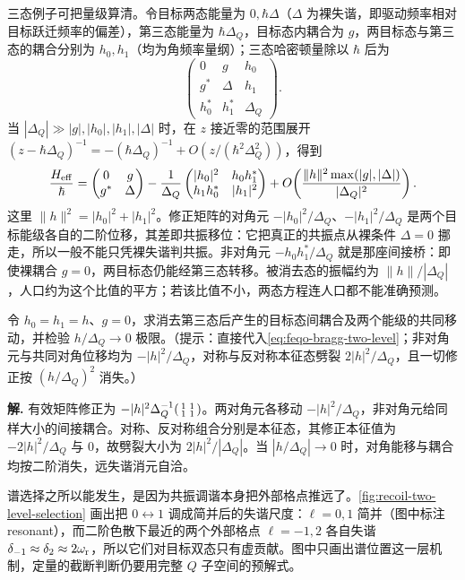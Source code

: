 三态例子可把量级算清。令目标两态能量为 \(0,\hbar\Delta\)（\(\Delta\) 为裸失谐，即驱动频率相对目标跃迁频率的偏差），第三态能量为 \(\hbar\Delta_Q\)，目标态内耦合为 \(g\)，两目标态与第三态的耦合分别为 \(h_0,h_1\)（均为角频率量纲）；三态哈密顿量除以 \(\hbar\) 后为
\[
\begin{pmatrix}
0&g&h_0\\g^*&\Delta&h_1\\h_0^*&h_1^*&\Delta_Q
\end{pmatrix}.
\]
当 \(|\Delta_Q|\gg |g|,|h_0|,|h_1|,|\Delta|\) 时，在 \(z\) 接近零的范围展开 \((z-\hbar\Delta_Q)^{-1}=-(\hbar\Delta_Q)^{-1}+O(z/(\hbar^2\Delta_Q^2))\)，得到
\begin{equation}
\frac{H_{\rm eff}}{\hbar}=
\begin{pmatrix}0&g\\g^*&\Delta\end{pmatrix}
-\frac1{\Delta_Q}
\begin{pmatrix}|h_0|^2&h_0h_1^*\\h_1h_0^*&|h_1|^2\end{pmatrix}
+O\!\left(\frac{\|h\|^2\max(|g|,|\Delta|)}{|\Delta_Q|^2}\right).
\label{eq:feqo-bragg-two-level}
\end{equation}
这里 \(\|h\|^2=|h_0|^2+|h_1|^2\)。修正矩阵的对角元 \(-|h_0|^2/\Delta_Q\)、\(-|h_1|^2/\Delta_Q\) 是两个目标能级各自的二阶位移，其差即共振移位：它把真正的共振点从裸条件 \(\Delta=0\) 挪走，所以一般不能只凭裸失谐判共振。非对角元 \(-h_0h_1^*/\Delta_Q\) 就是那座间接桥：即使裸耦合 \(g=0\)，两目标态仍能经第三态转移。被消去态的振幅约为 \(\|h\|/|\Delta_Q|\)，人口约为这个比值的平方；若该比值不小，两态方程连人口都不能准确预测。


\par
\begin{workedexample}
令 \(h_0=h_1=h\)、\(g=0\)，求消去第三态后产生的目标态间耦合及两个能级的共同移动，并检验 \(h/\Delta_Q\to0\) 极限。（提示：直接代入\cref{eq:feqo-bragg-two-level}；非对角元与共同对角位移均为 \(-|h|^2/\Delta_Q\)，对称与反对称本征态劈裂 \(2|h|^2/\Delta_Q\)，且一切修正按 \((h/\Delta_Q)^2\) 消失。）

\textbf{解.} 有效矩阵修正为 \(-|h|^2\Delta_Q^{-1}\begin{psmallmatrix}1&1\\1&1\end{psmallmatrix}\)。两对角元各移动 \(-|h|^2/\Delta_Q\)，非对角元给同样大小的间接耦合。对称、反对称组合分别是本征态，其修正本征值为 \(-2|h|^2/\Delta_Q\) 与 0，故劈裂大小为 \(2|h|^2/|\Delta_Q|\)。当 \(|h/\Delta_Q|\to0\) 时，对角能移与耦合均按二阶消失，远失谐消元自洽。
\end{workedexample}
\par
谱选择之所以能发生，是因为共振调谐本身把外部格点推远了。\cref{fig:recoil-two-level-selection} 画出把 \(0\leftrightarrow1\) 调成简并后的失谐尺度：\(\ell=0,1\) 简并（图中标注 resonant），而二阶色散下最近的两个外部格点 \(\ell=-1,2\) 各自失谐 \(\delta_{-1}\approx\delta_2\approx2\omega_{\rm r}\)，所以它们对目标双态只有虚贡献。图中只画出谱位置这一层机制，定量的截断判断仍要用完整 \(Q\) 子空间的预解式。

